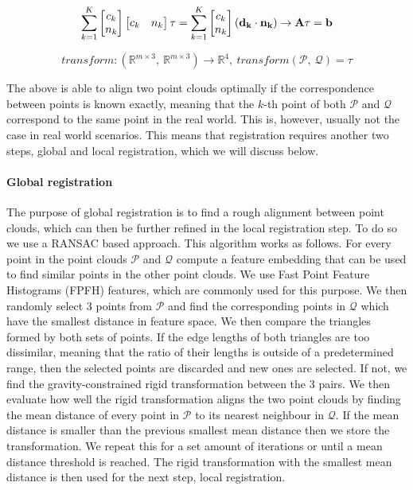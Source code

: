 \begin{equation}
    \label{eq:at_b}
    \sum_{k=1}^{K} \begin{bmatrix}
        c_k \\
        n_k
    \end{bmatrix}
    \begin{bmatrix}
        c_k & n_k
    \end{bmatrix}
    \tau = \sum_{k=1}^{K} \begin{bmatrix}
        c_k \\
        n_k
    \end{bmatrix} (\bf{d_k} \cdot \bf{n_k}) \rightarrow A \tau = \bf{b}
\end{equation}

\begin{equation}
    transform: (\mathbb{R}^{m \times 3},\ \mathbb{R}^{m \times 3}) \rightarrow \mathbb{R}^4,\ transform(\mathcal{P},\ \mathcal{Q}) = \tau
\end{equation}

The above is able to align two point clouds optimally if the correspondence between points is known exactly, meaning that the \(k\)-th point of both \(\mathcal{P}\) and \(\mathcal{Q}\) correspond to the same point in the real world. This is, however, usually not the case in real world scenarios. This means that registration requires another two steps, global and local registration, which we will discuss below.

\paragraph{Global registration}
The purpose of global registration is to find a rough alignment between point clouds, which can then be further refined in the local registration step. To do so we use a RANSAC based approach. This algorithm works as follows. For every point in the point clouds \(\mathcal{P}\) and \(\mathcal{Q}\) compute a feature embedding that can be used to find similar points in the other point clouds. We use Fast Point Feature Histograms (FPFH) features, which are commonly used for this purpose. We then randomly select 3 points from \(\mathcal{P}\) and find the corresponding points in \(\mathcal{Q}\) which have the smallest distance in feature space. We then compare the triangles formed by both sets of points. If the edge lengths of both triangles are too dissimilar, meaning that the ratio of their lengths is outside of a predetermined range, then the selected points are discarded and new ones are selected. If not, we find the gravity-constrained rigid transformation between the 3 pairs. We then evaluate how well the rigid transformation aligns the two point clouds by finding the mean distance of every point in \(\mathcal{P}\) to its nearest neighbour in \(\mathcal{Q}\). If the mean distance is smaller than the previous smallest mean distance then we store the transformation.
We repeat this for a set amount of iterations or until a mean distance threshold is reached. The rigid transformation with the smallest mean distance is then used for the next step, local registration.


